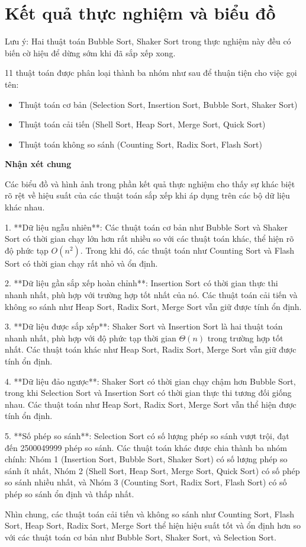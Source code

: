 \section{Kết quả thực nghiệm và biểu đồ}

Lưu ý: Hai thuật toán Bubble Sort, Shaker Sort trong thực nghiệm này đều có biến cờ hiệu để dừng sớm khi đã sắp xếp xong. 



11 thuật toán được phân loại thành ba nhóm như sau để thuận tiện cho việc gọi tên: 
\begin{itemize}
    \item Thuật toán cơ bản (Selection Sort, Insertion Sort, Bubble Sort, Shaker Sort)
    \item Thuật toán cải tiến (Shell Sort, Heap Sort, Merge Sort, Quick Sort)
    \item Thuật toán không so sánh (Counting Sort, Radix Sort, Flash Sort)
\end{itemize}




\textbf{Nhận xét chung}

Các biểu đồ và hình ảnh trong phần kết quả thực nghiệm cho thấy sự khác biệt rõ rệt về hiệu suất của các thuật toán sắp xếp khi áp dụng trên các bộ dữ liệu khác nhau. 

1. **Dữ liệu ngẫu nhiên**: Các thuật toán cơ bản như Bubble Sort và Shaker Sort có thời gian chạy lớn hơn rất nhiều so với các thuật toán khác, thể hiện rõ độ phức tạp $O(n^2)$. Trong khi đó, các thuật toán như Counting Sort và Flash Sort có thời gian chạy rất nhỏ và ổn định.

2. **Dữ liệu gần sắp xếp hoàn chỉnh**: Insertion Sort có thời gian thực thi nhanh nhất, phù hợp với trường hợp tốt nhất của nó. Các thuật toán cải tiến và không so sánh như Heap Sort, Radix Sort, Merge Sort vẫn giữ được tính ổn định.

3. **Dữ liệu được sắp xếp**: Shaker Sort và Insertion Sort là hai thuật toán nhanh nhất, phù hợp với độ phức tạp thời gian $\Theta(n)$ trong trường hợp tốt nhất. Các thuật toán khác như Heap Sort, Radix Sort, Merge Sort vẫn giữ được tính ổn định.

4. **Dữ liệu đảo ngược**: Shaker Sort có thời gian chạy chậm hơn Bubble Sort, trong khi Selection Sort và Insertion Sort có thời gian thực thi tương đối giống nhau. Các thuật toán như Heap Sort, Radix Sort, Merge Sort vẫn thể hiện được tính ổn định.

5. **Số phép so sánh**: Selection Sort có số lượng phép so sánh vượt trội, đạt đến 2500049999 phép so sánh. Các thuật toán khác được chia thành ba nhóm chính: Nhóm 1 (Insertion Sort, Bubble Sort, Shaker Sort) có số lượng phép so sánh ít nhất, Nhóm 2 (Shell Sort, Heap Sort, Merge Sort, Quick Sort) có số phép so sánh nhiều nhất, và Nhóm 3 (Counting Sort, Radix Sort, Flash Sort) có số phép so sánh ổn định và thấp nhất.

Nhìn chung, các thuật toán cải tiến và không so sánh như Counting Sort, Flash Sort, Heap Sort, Radix Sort, Merge Sort thể hiện hiệu suất tốt và ổn định hơn so với các thuật toán cơ bản như Bubble Sort, Shaker Sort, và Selection Sort.